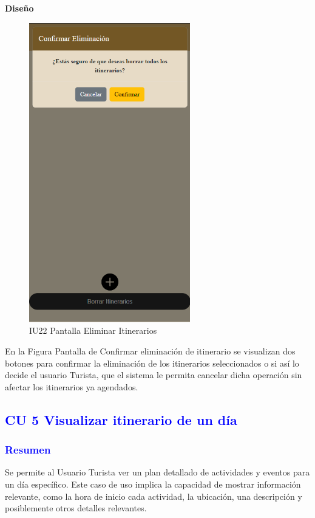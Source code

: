 \textbf{Diseño}
\begin{figure}[h]
        \centering
        \includegraphics[width= 7cm]{entregable final/pantallasSistema/IU22 Pantalla Eliminar Itinerarios.png}
        \caption{IU22 Pantalla Eliminar Itinerarios}
    \end{figure}
 

En la Figura Pantalla de Confirmar eliminación de itinerario se visualizan dos botones para confirmar la eliminación de los itinerarios seleccionados o si así lo decide el usuario Turista, que el sistema le permita cancelar dicha operación sin afectar los itinerarios ya agendados. 


\newpage


\subsection{\textcolor{blue}{CU 5 Visualizar itinerario de un día}}
\subsubsection{\textcolor{blue}{Resumen}}
Se permite al Usuario Turista ver un plan detallado de actividades y eventos para un día específico. Este caso de uso implica la capacidad de mostrar información relevante, como la hora de inicio cada actividad, la ubicación, una descripción y posiblemente otros detalles relevantes.

